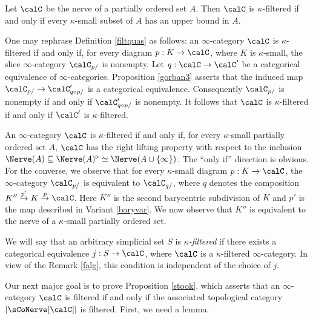 \begin{example}
Let $\calC$ be the nerve of a partially ordered set $A$. Then $\calC$ is $\kappa$-filtered if and only if every $\kappa$-small subset of $A$ has an upper bound in $A$.
\end{example}

\begin{remark}\label{falg}
One may rephrase Definition \ref{filtquas} as follows: an $\infty$-category $\calC$ is $\kappa$-filtered if and only if,
for every diagram $p: K \rightarrow \calC$, where $K$ is $\kappa$-small, the slice $\infty$-category
$\calC_{p/}$ is nonempty. 
Let $q: \calC \rightarrow \calC'$ be a categorical equivalence of $\infty$-categories. Proposition \ref{gorban3} asserts that the induced map $\calC_{p/} \rightarrow \calC'_{q \circ p/}$ is a categorical equivalence. Consequently $\calC_{p/}$ is nonempty if and only if $\calC'_{q \circ p/}$ is nonempty. It follows that $\calC$ is $\kappa$-filtered if and only if $\calC'$ is $\kappa$-filtered.
\end{remark}

\begin{remark}\label{tweeny}
An $\infty$-category $\calC$ is $\kappa$-filtered if and only if, for every
$\kappa$-small partially ordered set $A$, $\calC$ has the right lifting property with respect
to the inclusion $\Nerve(A) \subseteq \Nerve(A)^{\triangleright}  \simeq \Nerve(A \cup \{ \infty\} )$. The ``only if'' direction is obvious. For the converse, we observe that for every $\kappa$-small diagram $p: K \rightarrow \calC$, the $\infty$-category $\calC_{p/}$ is equivalent to
$\calC_{q/}$, where $q$ denotes the composition
$K'' \stackrel{p'}{\rightarrow} K \stackrel{p}{\rightarrow} \calC$. Here $K''$ is the second barycentric subdivision of $K$ and $p'$ is the map described in Variant \ref{baryvar}. We now observe that $K''$ is equivalent to the nerve of a $\kappa$-small partially ordered set. 
\end{remark}

\begin{remark}
We will say that an arbitrary simplicial set $S$ is {\it $\kappa$-filtered} if there exists a categorical equivalence $j: S \rightarrow \calC$, where $\calC$ is a $\kappa$-filtered $\infty$-category. In view of the Remark \ref{falg}, this condition is independent of the choice of $j$.
\end{remark}

Our next major goal is to prove Proposition \ref{stook}, which asserts that an $\infty$-category
$\calC$ is filtered if and only if the associated topological category $| \sCoNerve[\calC] |$ is filtered.
First, we need a lemma.

